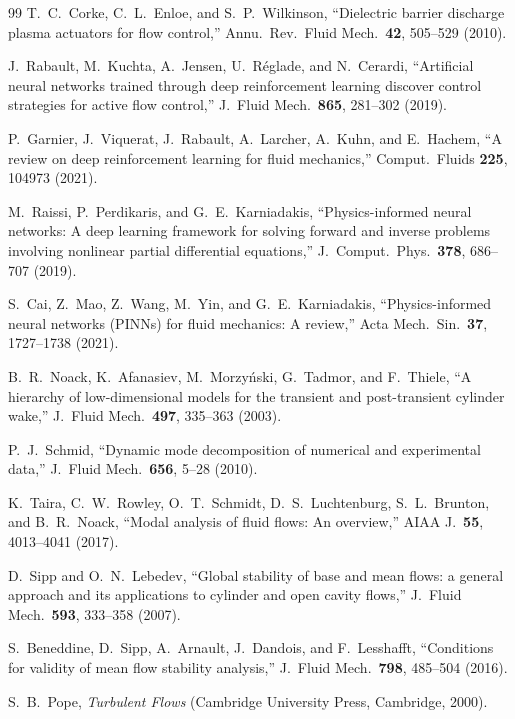 \documentclass[11pt,a4paper]{article}
\newenvironment{chgadd}{\par\color{blue}}{\par\color{black}}
\begin{document}
\begin{chgadd}
\begin{thebibliography}{99}
T.~C.~Corke, C.~L.~Enloe, and S.~P.~Wilkinson,
``Dielectric barrier discharge plasma actuators for flow control,''
Annu.\ Rev.\ Fluid Mech.\ \textbf{42}, 505--529 (2010).

J.~Rabault, M.~Kuchta, A.~Jensen, U.~R\'eglade, and N.~Cerardi,
``Artificial neural networks trained through deep reinforcement learning discover
control strategies for active flow control,''
J.\ Fluid Mech.\ \textbf{865}, 281--302 (2019).

P.~Garnier, J.~Viquerat, J.~Rabault, A.~Larcher, A.~Kuhn, and E.~Hachem,
``A review on deep reinforcement learning for fluid mechanics,''
Comput.\ Fluids \textbf{225}, 104973 (2021).

M.~Raissi, P.~Perdikaris, and G.~E.~Karniadakis,
``Physics-informed neural networks: A deep learning framework for solving forward
and inverse problems involving nonlinear partial differential equations,''
J.\ Comput.\ Phys.\ \textbf{378}, 686--707 (2019).

S.~Cai, Z.~Mao, Z.~Wang, M.~Yin, and G.~E.~Karniadakis,
``Physics-informed neural networks (PINNs) for fluid mechanics: A review,''
Acta Mech.\ Sin.\ \textbf{37}, 1727--1738 (2021).

B.~R.~Noack, K.~Afanasiev, M.~Morzy\'nski, G.~Tadmor, and F.~Thiele,
``A hierarchy of low-dimensional models for the transient and post-transient
cylinder wake,'' J.\ Fluid Mech.\ \textbf{497}, 335--363 (2003).

P.~J.~Schmid,
``Dynamic mode decomposition of numerical and experimental data,''
J.\ Fluid Mech.\ \textbf{656}, 5--28 (2010).

K.~Taira, C.~W.~Rowley, O.~T.~Schmidt, D.~S.~Luchtenburg, S.~L.~Brunton, and
B.~R.~Noack,
``Modal analysis of fluid flows: An overview,''
AIAA J.\ \textbf{55}, 4013--4041 (2017).

D.~Sipp and O.~N.~Lebedev,
``Global stability of base and mean flows: a general approach and its applications
to cylinder and open cavity flows,'' J.\ Fluid Mech.\ \textbf{593}, 333--358 (2007).

S.~Beneddine, D.~Sipp, A.~Arnault, J.~Dandois, and F.~Lesshafft,
``Conditions for validity of mean flow stability analysis,''
J.\ Fluid Mech.\ \textbf{798}, 485--504 (2016).

S.~B.~Pope, \textit{Turbulent Flows} (Cambridge University Press, Cambridge, 2000).


\end{thebibliography}
\end{chgadd}
\end{document}

